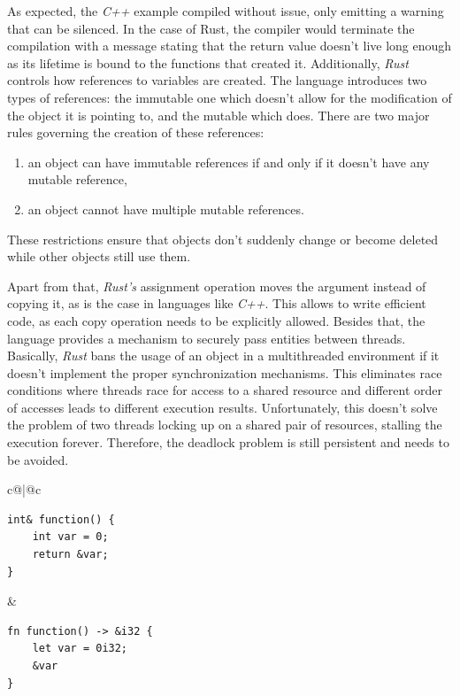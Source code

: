 
As expected, the \textit{C++} example compiled without issue, only emitting a warning that can be silenced. In the case of Rust, the compiler would terminate the compilation with a message stating that the return value doesn't live long enough as its lifetime is bound to the functions that created it. Additionally, \textit{Rust} controls how references to variables are created. The language introduces two types of references: the immutable one which doesn't allow for the modification of the object it is pointing to, and the mutable which does. There are two major rules governing the creation of these references:
\begin{enumerate}
    \item an object can have immutable references if and only if it doesn't have any mutable reference,
    \item an object cannot have multiple mutable references.
\end{enumerate}
These restrictions ensure that objects don't suddenly change or become deleted while other objects still use them.

Apart from that, \textit{Rust's} assignment operation moves the argument instead of copying it, as is the case in languages like \textit{C++}. This allows to write efficient code, as each copy operation needs to be explicitly allowed. Besides that, the language provides a mechanism to securely pass entities between threads. Basically, \textit{Rust} bans the usage of an object in a multithreaded environment if it doesn't implement the proper synchronization mechanisms. This eliminates race conditions where threads race for access to a shared resource and different order of accesses leads to different execution results. Unfortunately, this doesn't solve the problem of two threads locking up on a shared pair of resources, stalling the execution forever. Therefore, the deadlock problem is still persistent and needs to be avoided. 

\begin{table}
    \centering
    \begin{tabular}{c@{\hskip 1cm}|@{\hskip 1cm}c}
        \begin{lstlisting}
int& function() {
    int var = 0;
    return &var;
}
        \end{lstlisting} &
        \begin{lstlisting}
fn function() -> &i32 {
    let var = 0i32;
    &var
} 
        \end{lstlisting}\\
    \end{tabular}
    \label{lst:badcpprust}
\end{table}

